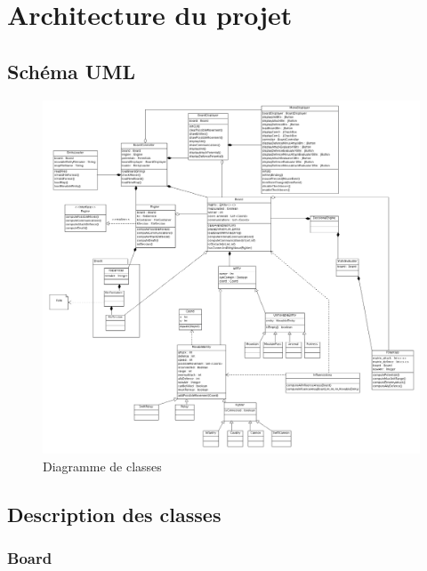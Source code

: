 \chapter{Architecture du projet}

	\section{Schéma UML}

		\begin{figure}[!h]
		    \caption{Diagramme de classes}
		    \centerline{\includegraphics[scale=0.38]{images/architecture/diagram.png}}
		\end{figure}

		\clearpage

	\section{Description des classes}

		\subsection*{Board}
		
